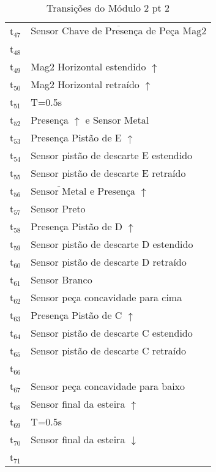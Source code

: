 \documentclass[11pt]{article}
\begin{document}
\begin{table}[htb]
\caption{Transições do Módulo 2 pt 2}
\centering
\begin{tabular}{ll}
t$_{\text{47}}$ & $\overline{\mbox{Sensor Chave de Presença de Peça Mag2}}$\\
t$_{\text{48}}$ & \\
t$_{\text{49}}$ & Mag2 Horizontal estendido $\uparrow$\\
t$_{\text{50}}$ & Mag2 Horizontal retraído $\uparrow$\\
t$_{\text{51}}$ & T=0.5s\\
t$_{\text{52}}$ & Presença $\uparrow$ e Sensor Metal\\
t$_{\text{53}}$ & Presença Pistão de E $\uparrow$\\
t$_{\text{54}}$ & Sensor pistão de descarte E estendido\\
t$_{\text{55}}$ & Sensor pistão de descarte E retraído\\
t$_{\text{56}}$ & $\overline{\mbox{Sensor Metal}}$ e Presença $\uparrow$\\
t$_{\text{57}}$ & Sensor Preto\\
t$_{\text{58}}$ & Presença Pistão de D $\uparrow$\\
t$_{\text{59}}$ & Sensor pistão de descarte D estendido\\
t$_{\text{60}}$ & Sensor pistão de descarte D retraído\\
t$_{\text{61}}$ & Sensor Branco\\
t$_{\text{62}}$ & Sensor peça concavidade para cima\\
t$_{\text{63}}$ & Presença Pistão de C $\uparrow$\\
t$_{\text{64}}$ & Sensor pistão de descarte C estendido\\
t$_{\text{65}}$ & Sensor pistão de descarte C retraído\\
t$_{\text{66}}$ & \\
t$_{\text{67}}$ & Sensor peça concavidade para baixo\\
t$_{\text{68}}$ & Sensor final da esteira $\uparrow$\\
t$_{\text{69}}$ & T=0.5s\\
t$_{\text{70}}$ & Sensor final da esteira $\downarrow$\\
t$_{\text{71}}$ & \\
\end{tabular}
\end{table}
\end{document}
